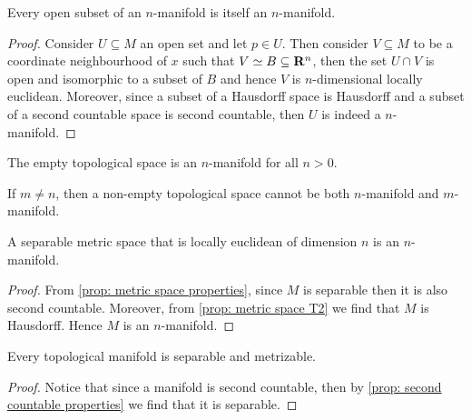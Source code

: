 \begin{proposition}
    Every open subset of an \(n\)-manifold is itself an \(n\)-manifold.
\end{proposition}

\begin{proof}
    Consider \(U \subseteq M\) an open set and let \(p \in U\). Then consider \(V
    \subseteq M\) to be a coordinate neighbourhood of \(x\) such that \(V \simeq B
    \subseteq \mathbf{R}^n\), then the set \(U \cap V\) is open and isomorphic
    to a subset of \(B\) and hence \(V\) is \(n\)-dimensional locally euclidean.
    Moreover, since a subset of a Hausdorff space is Hausdorff and a subset of a
    second countable space is second countable, then \(U\) is indeed a
    \(n\)-manifold.
\end{proof}

\begin{definition}
    The empty topological space is an \(n\)-manifold for all \(n > 0\).
\end{definition}

\begin{theorem}\label{def: manifold dimension invariance}
    If \(m \neq n\), then a non-empty topological space cannot be both
    \(n\)-manifold and \(m\)-manifold.
\end{theorem}

\begin{proposition}
    A separable metric space that is locally euclidean of dimension \(n\) is an
    \(n\)-manifold.
\end{proposition}

\begin{proof}
    From \cref{prop: metric space properties}, since \(M\) is separable then it is
    also second countable. Moreover, from \cref{prop: metric space T2} we find
    that \(M\) is Hausdorff. Hence \(M\) is an \(n\)-manifold.
\end{proof}

\begin{proposition}
    Every topological manifold is separable and metrizable.
\end{proposition}

\begin{proof}
    Notice that since a manifold is second countable, then by \cref{prop: second
        countable properties} we find that it is separable.
\end{proof}

